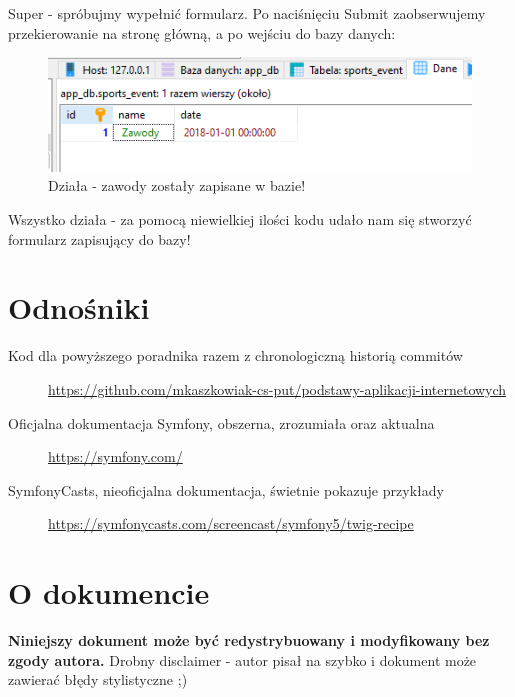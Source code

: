 \documentclass[polish, a4paper]{article}
\begin{document}
Super - spróbujmy wypełnić formularz. Po naciśnięciu Submit zaobserwujemy przekierowanie na stronę główną, a po wejściu do bazy danych:

\begin{figure}[H]
  \centering
  \includegraphics[width=\textwidth]{zawody.png}
  \caption{Działa - zawody zostały zapisane w bazie!}
\end{figure}

Wszystko działa - za pomocą niewielkiej ilości kodu udało nam się stworzyć formularz zapisujący do bazy!

\section{Odnośniki}

\begin{description}
    \item[Kod dla powyższego poradnika razem z chronologiczną historią commitów]{\href{https://github.com/mkaszkowiak-cs-put/podstawy-aplikacji-internetowych}{https://github.com/mkaszkowiak-cs-put/podstawy-aplikacji-internetowych}}
    \item[Oficjalna dokumentacja Symfony, obszerna, zrozumiała oraz aktualna]{\href{https://symfony.com/}{https://symfony.com/}}
    \item[SymfonyCasts, nieoficjalna dokumentacja, świetnie pokazuje przykłady]{\href{https://symfonycasts.com/screencast/symfony5/twig-recipe}{https://symfonycasts.com/screencast/symfony5/twig-recipe}}
\end{description}

\section{O dokumencie}

\textbf{Niniejszy dokument może być redystrybuowany i modyfikowany bez zgody autora.} Drobny disclaimer - autor pisał na szybko i dokument może zawierać błędy stylistyczne ;) 
\end{document}
